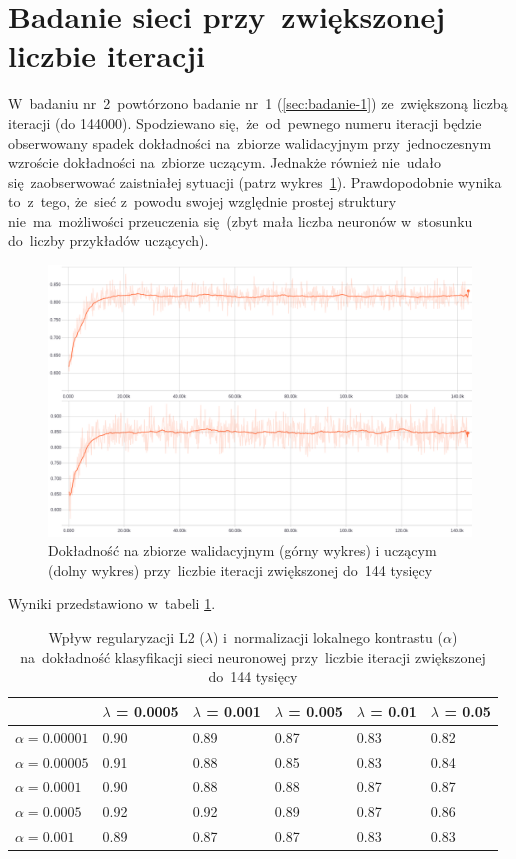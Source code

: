 \section{Badanie sieci przy~zwiększonej liczbie iteracji}
W~badaniu nr~2~powtórzono badanie nr~1 (\ref{sec:badanie-1}) ze~zwiększoną liczbą iteracji (do 144000).
Spodziewano się,~że~od~pewnego numeru iteracji będzie obserwowany spadek dokładności na~zbiorze walidacyjnym
przy~jednoczesnym wzroście dokładności na~zbiorze uczącym. Jednakże również nie~udało się~zaobserwować zaistniałej
sytuacji (patrz wykres~\ref{rys:badanie-2}). Prawdopodobnie wynika to~z~tego, że~sieć z~powodu swojej względnie prostej
struktury nie~ma~możliwości przeuczenia się~(zbyt mała liczba neuronów w~stosunku do~liczby przykładów uczących).

\begin{figure}[H]
	\centering
	\includegraphics[width=\linewidth]{img/badanie_2.png}
	\caption{Dokładność na zbiorze walidacyjnym (górny wykres) i uczącym (dolny wykres) przy~liczbie iteracji
	         zwiększonej do~144 tysięcy}
	\label{rys:badanie-2}
\end{figure}

Wyniki przedstawiono w~tabeli \ref{table:wyniki2}.

\begin{table}[H]
    \centering
    \begin{tabular}{|l|l|l|l|l|l|}
      \hline
                       & $\lambda$ = 0.0005 & $\lambda$ = 0.001 & $\lambda$ = 0.005 & $\lambda$ = 0.01 & $\lambda$ = 0.05 \\
      \hline
      $\alpha=0.00001$ & 0.90 & 0.89 & 0.87 & 0.83 & 0.82 \\
      \hline
      $\alpha=0.00005$ & 0.91 & 0.88 & 0.85 & 0.83 & 0.84 \\
      \hline
      $\alpha=0.0001$  & 0.90 & 0.88 & 0.88 & 0.87 & 0.87 \\
      \hline
      $\alpha=0.0005$  & 0.92 & 0.92 & 0.89 & 0.87 & 0.86 \\
      \hline
      $\alpha=0.001$   & 0.89 & 0.87 & 0.87 & 0.83 & 0.83 \\
      \hline
    \end{tabular}
    \caption{Wpływ regularyzacji L2 ($\lambda$) i~normalizacji lokalnego kontrastu ($\alpha$) na~dokładność klasyfikacji
    sieci neuronowej przy~liczbie iteracji zwiększonej do~144 tysięcy}
    \label{table:wyniki2}
\end{table}


